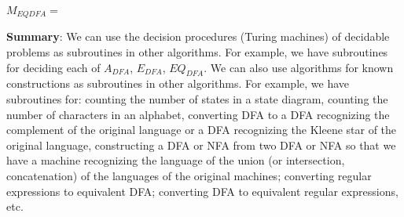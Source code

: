 \documentclass[12pt, oneside]{article}
\begin{document}
$M_{EQDFA} = $ 


  \vfill
  

  {\bf Summary}:  We can use the decision procedures (Turing machines) of decidable problems
  as subroutines in other algorithms. For example, we have subroutines for deciding each of 
  $A_{DFA}$, $E_{DFA}$, $EQ_{DFA}$.  We can also use algorithms for known constructions
  as subroutines in other algorithms. For example, we have subroutines for: counting the number 
  of states in a state diagram, counting the number of characters in an alphabet, converting DFA
  to a DFA recognizing the complement of the original language or a DFA recognizing the 
  Kleene star of the original language, constructing a DFA or NFA from two DFA or NFA so that 
  we have a machine recognizing the language of the union (or intersection, concatenation)
  of the languages of the original machines; converting regular expressions to equivalent DFA; 
  converting DFA to equivalent regular expressions, etc.
 \vfill
\end{document}
